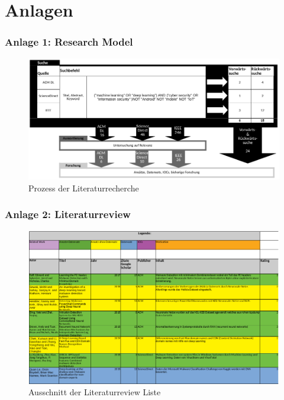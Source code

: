 \documentclass[
    12pt, %
    DIV10,
    ngerman, %
    a4paper, %
    oneside, %
    titlepage, %
    parskip=half, %
    headings=normal, %
    listof=totoc, %
    bibliography=totoc, %
    index=totoc, %
    captions=tableheading, %
    final %
]{scrreprt}
\begin{document}
\chapter{Anlagen}
\subsection*{Anlage 1: Research Model}\label{rm}

\begin{figure}[h!]
\hspace{-2.3cm}
\includegraphics[width=1.3\textwidth]{img/rm}
\caption*{Prozess der Literaturrecherche}
\end{figure}
\newpage
\subsection*{Anlage 2: Literaturreview}\label{literaturr}

\begin{figure}[h!]
\hspace{-2.2cm}
\includegraphics[width=1.3\textwidth]{img/literaturr}
\caption*{Ausschnitt der Literaturreview Liste}
\end{figure}
\end{document}
